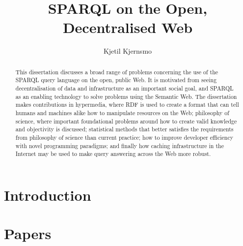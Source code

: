 \documentclass[a4paper, 12pt]{uiophd}
\begin{document}
\title{SPARQL on the Open, Decentralised Web}
\author{Kjetil Kjernsmo}


\frontmatter
\maketitle


\begin{abstract}
  This dissertation discusses a broad range of problems concerning the
  use of the SPARQL query language on the open, public Web. It is
  motivated from seeing decentralisation of data and infrastructure as
  an important social goal, and SPARQL as an enabling technology to
  solve problems using the Semantic Web. The dissertation makes
  contributions in hypermedia, where RDF is used to create a format
  that can tell humans and machines alike how to manipulate resources
  on the Web; philosophy of science, where important foundational
  problems around how to create valid knowledge and objectivity is
  discussed; statistical methods that better satisfies the
  requirements from philosophy of science than current practice; how
  to improve developer efficiency with novel programming paradigms;
  and finally how caching infrastructure in the Internet may be used
  to make query answering across the Web more robust.
\end{abstract}

\tableofcontents

\chapter{Introduction}












\chapter{Papers}







\end{document}
